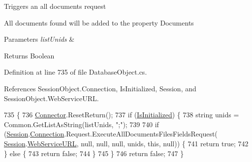 Triggers an all documents request

All documents found will be added to the property \textquotesingle{}Documents\textquotesingle{}


\begin{DoxyParams}{Parameters}
{\em list\+Unids} & \\
\hline
\end{DoxyParams}
\begin{DoxyReturn}{Returns}
Boolean
\end{DoxyReturn}


Definition at line 735 of file Database\+Object.\+cs.



References Session\+Object.\+Connection, Is\+Initialized, Session, and Session\+Object.\+Web\+Service\+U\+RL.


\begin{DoxyCode}
735                                                                          \{
736         \mbox{\hyperlink{class_connector}{Connector}}.ResetReturn();
737         \textcolor{keywordflow}{if} (\mbox{\hyperlink{class_database_object_a5fe036d32a30eb10d1b3f6a30263f740}{IsInitialized}}) \{
738             \textcolor{keywordtype}{string} unids = Common.GetListAsString(listUnids, \textcolor{stringliteral}{";"});
739 
740             \textcolor{keywordflow}{if} (\mbox{\hyperlink{class_database_object_aa8484162b7d2a7c4c9426bca13c64c07}{Session}}.\mbox{\hyperlink{class_session_object_a014bdbf705a753540e19bfb53030c55c}{Connection}}.Request.ExecuteAllDocumentsFilesFieldsRequest(
      \mbox{\hyperlink{class_database_object_aa8484162b7d2a7c4c9426bca13c64c07}{Session}}.\mbox{\hyperlink{class_session_object_a697c071c812fbf7ad1166b896fb44c16}{WebServiceURL}}, null, null, null, unids, \textcolor{keyword}{this}, null)) \{
741                 \textcolor{keywordflow}{return} \textcolor{keyword}{true};
742             \} \textcolor{keywordflow}{else} \{
743                 \textcolor{keywordflow}{return} \textcolor{keyword}{false};
744             \}
745         \}
746         \textcolor{keywordflow}{return} \textcolor{keyword}{false};
747     \}
\end{DoxyCode}
\mbox{\label{class_database_object_aaf0f7fbe6f346bfc24b3844610c3e8f3}} 
